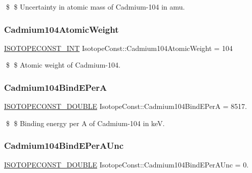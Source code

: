 \$ \$ Uncertainty in atomic mass of Cadmium-\/104 in amu. \mbox{\label{group___isotope_const-_cadmium-_cd104_ga9a59f7b147ce14a81d6d1b9c772d339d}} 
\subsubsection{\texorpdfstring{Cadmium104\+Atomic\+Weight}{Cadmium104AtomicWeight}}
{\footnotesize\ttfamily \mbox{\hyperlink{group___isotope_const-_macros_ga5f18360b3e99483a35c32d789e62621c}{I\+S\+O\+T\+O\+P\+E\+C\+O\+N\+S\+T\+\_\+\+I\+NT}} Isotope\+Const\+::\+Cadmium104\+Atomic\+Weight = 104}

\$ \$ Atomic weight of Cadmium-\/104. \mbox{\label{group___isotope_const-_cadmium-_cd104_ga1ec22f4c3b894947c7c9734dfd6833ef}} 
\subsubsection{\texorpdfstring{Cadmium104\+Bind\+E\+PerA}{Cadmium104BindEPerA}}
{\footnotesize\ttfamily \mbox{\hyperlink{group___isotope_const-_macros_ga8f45a7272ce02c0b4c65c44636ed719a}{I\+S\+O\+T\+O\+P\+E\+C\+O\+N\+S\+T\+\_\+\+D\+O\+U\+B\+LE}} Isotope\+Const\+::\+Cadmium104\+Bind\+E\+PerA = 8517.}

\$ \$ Binding energy per A of Cadmium-\/104 in keV. \mbox{\label{group___isotope_const-_cadmium-_cd104_gab947a703dec26407a94c22408ac799e3}} 
\subsubsection{\texorpdfstring{Cadmium104\+Bind\+E\+Per\+A\+Unc}{Cadmium104BindEPerAUnc}}
{\footnotesize\ttfamily \mbox{\hyperlink{group___isotope_const-_macros_ga8f45a7272ce02c0b4c65c44636ed719a}{I\+S\+O\+T\+O\+P\+E\+C\+O\+N\+S\+T\+\_\+\+D\+O\+U\+B\+LE}} Isotope\+Const\+::\+Cadmium104\+Bind\+E\+Per\+A\+Unc = 0.}

